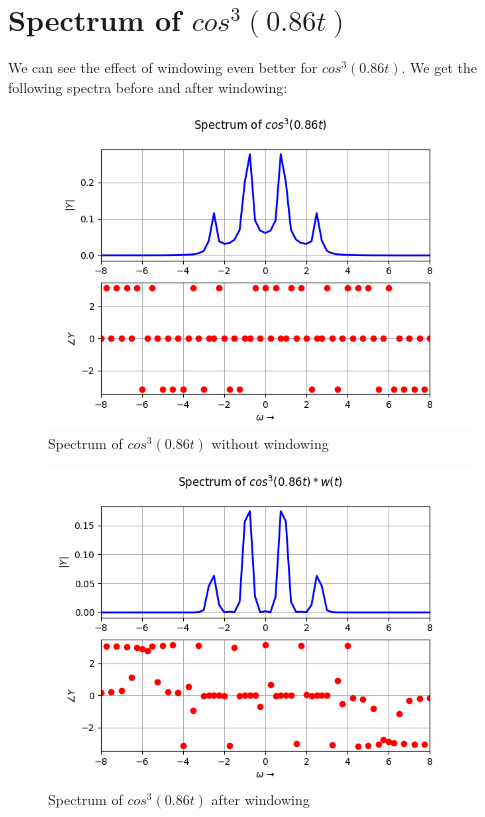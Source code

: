 \documentclass[11pt, a4paper, twoside]{article}
\begin{document}
\section{Spectrum of $cos^3(0.86 t)$}
    We can see the effect of windowing even better for $cos^3(0.86 t)$. We get the following spectra before and after windowing:
    \begin{figure}[H]
        \centering
        \includegraphics[scale=0.5]{Fig2.png}
        \caption{Spectrum of $cos^3(0.86 t)$ without windowing}
        \label{fig:Fig2}
    \end{figure}
    \begin{figure}[H]
        \centering
        \includegraphics[scale=0.5]{Fig3.png}
        \caption{Spectrum of $cos^3(0.86 t)$ after windowing}
        \label{fig:Fig3}
    \end{figure}
    
\end{document}
